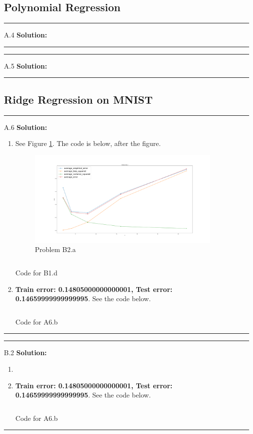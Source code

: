 \documentclass{article}
\newcommand{\1}{\mathbf{1}}
\begin{document}
\subsection*{Polynomial Regression}

\noindent\rule{\textwidth}{1pt}
A.4 {\bf Solution:}\\
\noindent\rule{\textwidth}{1pt}
    
\noindent\rule{\textwidth}{1pt}
A.5 {\bf Solution:}\\

\noindent\rule{\textwidth}{1pt}

\subsection*{Ridge Regression on MNIST}
\noindent\rule{\textwidth}{1pt}
A.6 {\bf Solution:}\\
\begin{enumerate}
    \item See Figure \ref{figure:b1.d}. The code is below, after the figure.
         \begin{figure}[h!]
            \centering
            \includegraphics[width=0.9\textwidth]{code/b1_d.pdf}
            \caption{Problem B2.a}
            \label{figure:b1.d}
         \end{figure}
         
         \inputminted{python}{code/b1_d.py}
          \caption{Code for B1.d}
          \label{listing:b1.d}
    \item {\bf Train error: 0.14805000000000001, Test error: 0.14659999999999995}. See the code below. 
          \inputminted{python}{code/A6_b.py}
          \caption{Code for A6.b}
          \label{listing:a6.b}
\end{enumerate}
\noindent\rule{\textwidth}{1pt}
\noindent\rule{\textwidth}{1pt}
B.2 {\bf Solution:}\\
\begin{enumerate}
    \item 
    \item {\bf Train error: 0.14805000000000001, Test error: 0.14659999999999995}. See the code below. 
          \inputminted{python}{code/A6_b.py}
          \caption{Code for A6.b}
          \label{listing:a6.b}
\end{enumerate}
\noindent\rule{\textwidth}{1pt}
 
\end{document}
